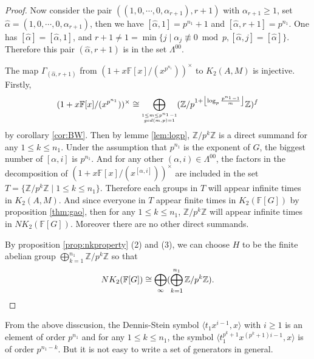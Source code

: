 \begin{proof}
Now consider the pair $((1,0,\cdots,0,\alpha_{r+1}),r+1)$ with $\alpha_{r+1}\geq 1$, set $\hat{\alpha}=(1,0,\cdots,0,\alpha_{r+1})$, then we have $[\hat{\alpha},1]=p^{n_1}+1$ and $[\hat{\alpha},r+1]=p^{n_1}$. One has $[\hat{\alpha}]=[\hat{\alpha},1]$, and $r+1\neq 1=\min\{j\mid\alpha_j \not\equiv 0 \bmod p, [\hat{\alpha},j]=[\hat{\alpha}]\}$. Therefore this pair $(\hat{\alpha},r+1) $ is in the set $\Lambda^{00}$. %

The map $\Gamma_{(\hat{\alpha},r+1)}$ from $(1+x\mathbb{F}[x]/(x^{p^{n_1}}))^{\times}$ to $K_2(A,M)$ is injective. Firstly, 
\[(1+x\mathbb{F}[x]/(x^{p^{n_1}}))^{\times}\cong \bigoplus_{\scriptsize\substack{1\leq m\leq  p^{n_1}-1 \\ gcd(m,p)=1 }}(\mathbb{Z}/p^{1+ \left \lfloor\log_p \frac{p^{n_1}-1}{m}  \right \rfloor}\mathbb{Z})^f \]
 by corollary \ref{cor:BW}. Then by lemme \ref{lem:logp}, $\mathbb{Z}/p^k\mathbb{Z}$ is a direct summand for any $1\leq k\leq {n_1}$. Under the assumption that $p^{n_1}$ is the exponent of $G$, the biggest number of $[\alpha,i]$ is $p^{n_1}$. And for any other $(\alpha,i)\in \Lambda^{00}$, the factors in the decomposition of $(1+x\mathbb{F}[x]/(x^{[\alpha,i]}))^{\times}$ are included in the set $T=\{\mathbb{Z}/p^k\mathbb{Z} \mid 1\leq k\leq {n_1}\}$. Therefore each groups in $T$ will appear infinite times in $K_2(A,M)$. And since everyone in $T$ appear finite times in $K_2(\mathbb{F}[G])$ by proposition \ref{thm:gao}, then for any $1\leq k\leq n_1$,  $\mathbb{Z}/p^k\mathbb{Z}$ will appear infinite times in $NK_2(\mathbb{F}[G])$. Moreover there are no other direct summands.

By proposition \ref{prop:nkproperty} (2) and (3), we can choose $H$ to be the finite abelian group $\bigoplus_{k=1}^{n_1}\mathbb{Z}/p^k\mathbb{Z}$ so that 
\[NK_2(\mathbb{F}[G])\cong \bigoplus_{\infty}(\bigoplus_{k=1}^{n_1}\mathbb{Z}/p^k\mathbb{Z}). \qedhere\] 
\end{proof}
From the above disscusion, the Dennis-Stein symbol $\langle t_1x^{i-1},x\rangle$ with $i\geq 1$ is an element of order $p^{n_1}$ and for any $1\leq k\leq n_1$, the symbol $\langle t_1^{p^k+1}x^{(p^k+1)i-1},x \rangle$ is of order $p^{n_1-k}$. But it is not easy to write a set of generators in general.
